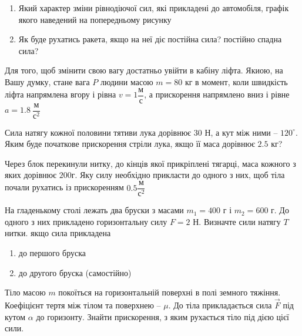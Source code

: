 \begin{problem}{2}
\begin{enumerate}
		\item Який характер зміни рівнодіючої сил, які прикладені до автомобіля, графік якого наведений на попередньому рисунку
		
		\item Як буде рухатись ракета, якщо на неї діє постійна сила? постійно спадна сила?
	\end{enumerate}
\end{problem}

	\begin{problem}{3}
		Для того, щоб змінити свою вагу достатньо увійти в кабіну ліфта. Якиою, на Вашу думку, стане вага $P$ людини масою $m = 80$ кг в момент, коли швидкість ліфта напрямлена вгору і рівна $v = 1 \dfrac{\text{м}}{\text{с}}$, а прискорення напрямлено вниз і рівне $a = 1.8~\dfrac{\text{м}}{\text{с}^2}$
	\end{problem}

	\begin{problem}{4}
		Сила натягу кожної половини тятиви лука дорівнює $30$ Н, а кут між ними -- $120^{\circ}$. Яким буде початкове прискорення стріли лука, якщо її маса дорівнює $2.5$ кг?
	\end{problem}

	\begin{problem}{4}
		Через блок перекинули нитку, до кінців якої прикріплені тягарці, маса кожного з яких дорівнює $200 $г. Яку силу необхідно прикласти до одного з них, щоб тіла почали рухатись із прискоренням $0.5 \dfrac{\text{м}}{\text{с}^2}$ 
	\end{problem}

	\begin{problem}{5}
		На гладенькому столі лежать два бруски з масами $m_1 = 400$ г і $m_2 = 600$ г. До одного з них прикладено горизонтальну силу $F = 2$ Н. Визначте сили натягу $T$ нитки. якщо сила прикладена 
		\begin{enumerate}
			\item до першого бруска
			\item до другого бруска (самостійно)
		\end{enumerate}
	\end{problem}

	\begin{problem}{6}
		Тіло масою $m$ покоїться на горизонтальній поверхні в полі земного тяжіння. Коефіцієнт тертя між тілом та поверхнею -- $\mu$. До тіла прикладається сила $\vec{F}$ під кутом $\alpha$ до горизонту. Знайти прискорення, з яким рухається тіло під дією цієї сили.
	\end{problem}

